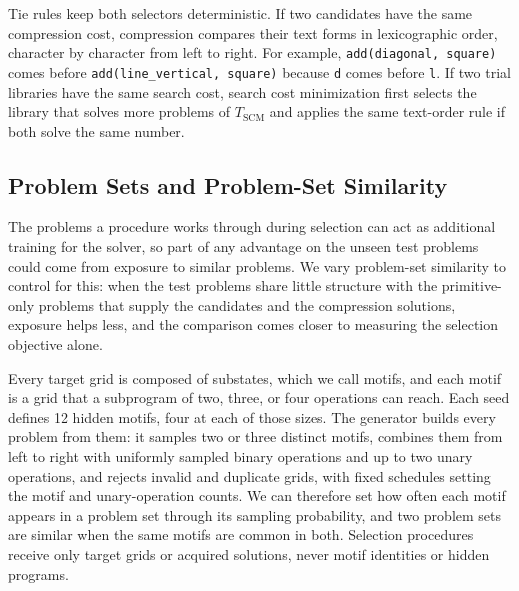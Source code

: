 \documentclass[10pt]{article}
\begin{document}
Tie rules keep both selectors deterministic. If two candidates have the same
compression cost, compression compares their text forms in lexicographic
order, character by character from left to right. For example,
\texttt{add(diagonal, square)} comes before
\texttt{add(line\_vertical, square)} because \texttt{d} comes before
\texttt{l}. If two trial libraries have the same search cost, search cost
minimization first selects the library that solves more problems of
$T_{\mathrm{SCM}}$ and applies the same text-order rule if both
solve the same number.

\subsection{Problem Sets and Problem-Set Similarity}

The problems a procedure works through during selection can act as
additional training for the solver, so part of any advantage on the unseen
test problems could come from exposure to similar problems. We vary
problem-set similarity to control for this: when the test problems share
little structure with the primitive-only problems that supply the candidates
and the compression solutions, exposure helps less, and the comparison comes
closer to measuring the selection objective alone.

Every target grid is composed of substates, which we call motifs, and each
motif is a grid that a subprogram of two, three, or four operations can
reach. Each seed defines 12 hidden motifs, four at each of those sizes. The
generator builds every problem from them: it samples two or three distinct
motifs, combines them from left to right with uniformly sampled binary
operations and up to two unary operations, and rejects invalid and duplicate
grids, with fixed schedules setting the motif and unary-operation counts. We
can therefore set how often each motif appears in a problem set through its
sampling probability, and two problem sets are similar when the same motifs
are common in both. Selection procedures receive only target grids or
acquired solutions, never motif identities or hidden programs.
\end{document}
